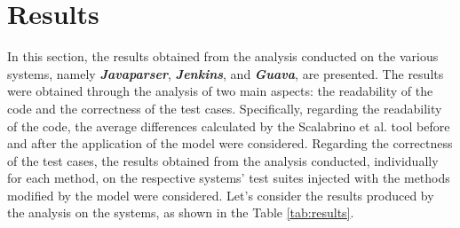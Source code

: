\chapter{Results}
\label{Chapter4}

In this section, the results obtained from the analysis conducted on the various systems, namely \textbf{\textit{Javaparser}}, \textbf{\textit{Jenkins}}, and \textbf{\textit{Guava}}, are presented. The results were obtained through the analysis of two main aspects: the readability of the code and the correctness of the test cases. Specifically, regarding the readability of the code, the average differences calculated by the Scalabrino et al. \cite{Scalabrino2018} tool before and after the application of the model were considered. Regarding the correctness of the test cases, the results obtained from the analysis conducted, individually for each method, on the respective systems' test suites injected with the methods modified by the model were considered.\newline \newline
Let's consider the results produced by the analysis on the systems, as shown in the Table \ref{tab:results}.
